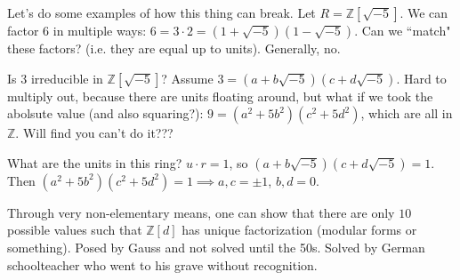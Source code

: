 \documentclass{article}
\theoremstyle{plain}
\theoremstyle{remark}
\newcommand{\Z}{{\mathbb Z}}
\begin{document}
Let's do some examples of how this thing can break.
Let $R = \Z[\sqrt{-5}]$.
We can factor $6$ in multiple ways: $6 = 3 \cdot 2 = (1+\sqrt{-5})(1-\sqrt{-5})$.
Can we ``match" these factors? (i.e. they are equal up to units).
Generally, no.

Is $3$ irreducible in $\Z[\sqrt{-5}]$?
Assume $3 = (a + b\sqrt{-5})(c +d\sqrt{-5})$.
Hard to multiply out, because there are units floating around,
but what if we took the abolsute value
(and also squaring?):
$9 = (a^2 + 5b^2)(c^2 + 5d^2)$, which are all in $\Z$.
Will find you can't do it???

What are the units in this ring?
$u \cdot r = 1$,
so $(a+b\sqrt{-5})(c+d\sqrt{-5}) = 1$.
Then $(a^2+5b^2)(c^2+5d^2) = 1 \implies a,c = \pm 1$, $b,d = 0$.

Through very non-elementary means,
one can show that there are only $10$ possible values such that $\Z[d]$
has unique factorization (modular forms or something).
Posed by Gauss and not solved until the 50s.
Solved by German schoolteacher who went to his grave without recognition.
\end{document}
